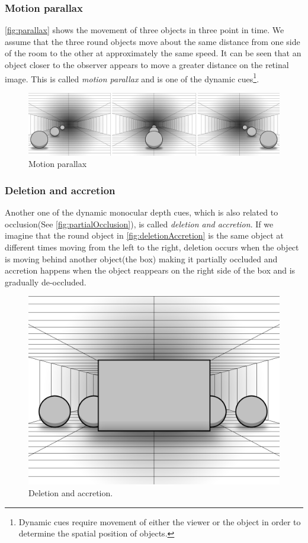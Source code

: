 \subsubsection{Motion parallax}\label{sec:parallax}
\autoref{fig:parallax} shows the movement of three objects in three point in time. We assume that the three round objects move about the same distance from one side of the room to the other at approximately the same speed. It can be seen that an object closer to the observer appears to move a greater distance on the retinal image. This is called \textit{motion parallax} and is one of the dynamic cues\footnote{Dynamic cues require movement of either the viewer or the object in order to determine the spatial position of objects\citep{sensationPerception}.}\citep[p.~204]{sensationPerception}.
\begin{figure}[H]
	\centering
	\includegraphics[width=1\linewidth]{figure/Analysis/parallax.png}
	\caption{Motion parallax}
	\label{fig:parallax}
\end{figure}

\subsubsection{Deletion and accretion}
Another one of the dynamic monocular depth cues, which is also related to occlusion(See \autoref{fig:partialOcclusion}), is called \textit{deletion and accretion}. If we imagine that the round object in \autoref{fig:deletionAccretion} is the same object at different times moving from the left to the right, deletion occurs when the object is moving behind another object(the box) making it partially occluded and accretion happens when the object reappears on the right side of the box and is gradually de-occluded\citep[p.~207]{sensationPerception}.
\begin{figure}[H]
	\centering
	\includegraphics[width=0.8\linewidth]{figure/Analysis/deletionAccretion.png}
	\caption{Deletion and accretion.}
	\label{fig:deletionAccretion}
\end{figure}


